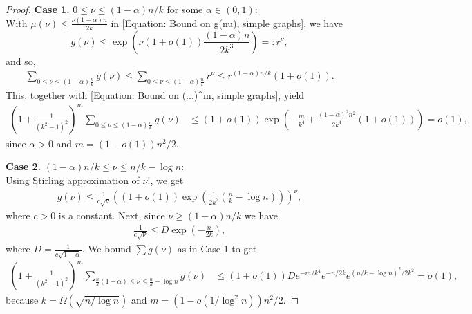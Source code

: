 \documentclass[12pt]{article}
\newcommand{\1}{\mathds{1}}
\begin{document}
\begin{proof}
    \newcommand{\factorinfront}{\left(1+\frac{1}{(k^2-1)^2}\right)^m}

    \vspace{\baselineskip}
        

    \textbf{Case 1.} $0 \le \nu \le (1-\alpha)n/k$ for some $\alpha\in (0,1)$: \\
    With $\mu(\nu)\leq \frac{\nu(1-\alpha)n}{2k}$ in \eqref{Equation: Bound on g(nu), simple graphs}, we have
    $$
    g(\nu)\leq \exp\left(\nu(1+o(1))\frac{(1-\alpha)n}{2k^3}\right)=:r^\nu,
    $$
and so,
    \begin{align*}
        \sum_{0 \leq \nu \leq (1-\alpha)\frac{n}{k}}g(\nu)
	\leq \sum_{0 \leq \nu \leq (1-\alpha)\frac{n}{k}}r^\nu\leq r^{(1-\alpha)n/k}(1+o(1)).
    \end{align*}
    This, together with \eqref{Equation: Bound on (...)^m, simple graphs}, yield
    \begin{align*}
        \factorinfront \sum_{0 \leq \nu \leq (1-\alpha)\frac{n}{k}}g(\nu) &\le (1+o(1))\exp\left(-\frac{m}{k^4}+\frac{(1-\alpha)^2n^2}{2k^4}(1+o(1))\right) 
        =o(1),
    \end{align*}
    since $\alpha>0$ and $m=(1-o(1))n^2/2$.

    \vspace{\baselineskip}

    \textbf{Case 2.} $(1-\alpha)n/k \le \nu \le n/k -\log n$: \hfill \\
    Using Stirling approximation of $\nu!$, we get
    \begin{align*}
        g(\nu)\le \frac{1}{c\sqrt{\nu}}\left((1+o(1))\exp\left(\frac{1}{2k^2}\left(\frac{n}{k}-\log n\right)\right)\right)^{\nu},
    \end{align*}
    where $c>0$ is a constant. Next, since $\nu\geq (1-\alpha)n/k$ we have
    \begin{align*}
        \frac{1}{c\sqrt{\nu}} 
        \le D\exp\left(-\frac{n}{2k}\right),
    \end{align*}
    where $D=\frac{1}{c\sqrt{1-\alpha}}$. We bound $\sum g(\nu)$ as in Case 1 to get
    \begin{align*}
        \factorinfront \sum_{\frac{n}{k}(1-\alpha)\le \nu \le \frac{n}{k}-\log n}g(\nu) 
	& \le (1+o(1)) D e^{-m/k^4} e^{-n/2k} e^{(n/k-\log n)^2/2k^2}=o(1),
    \end{align*}
    because $k=\Omega(\sqrt{n/\log n})$ and $m=(1-o(1/\log ^2n))n^2/2$.


    \vspace{\baselineskip}



\end{proof}
\end{document}
